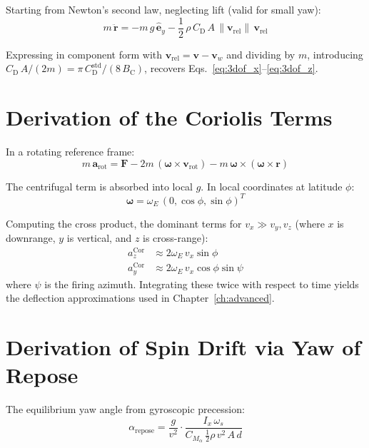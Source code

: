 \documentclass[11pt,twoside,openright]{report}
\newcommand{\Cd}{C_{\mathrm{D}}}
\newcommand{\Bc}{B_{\mathrm{C}}}
\newcommand{\vvec}{\bm{v}}
\newcommand{\avec}{\bm{a}}
\newcommand{\rvec}{\bm{r}}
\begin{document}
Starting from Newton's second law, neglecting lift (valid for small yaw):
\begin{equation}
  m\,\ddot{\rvec} = -m\,g\,\hat{\bm{e}}_y - \frac{1}{2}\,\rho\,\Cd\,A\,\|\vvec_{\mathrm{rel}}\|\,\vvec_{\mathrm{rel}}
\end{equation}

Expressing in component form with $\vvec_{\mathrm{rel}} = \vvec - \vvec_w$ and dividing by $m$, introducing $\Cd\,A/(2m) = \pi\,\Cd^{\mathrm{std}}/(8\,\Bc)$, recovers Eqs.~\eqref{eq:3dof_x}--\eqref{eq:3dof_z}.

\section{Derivation of the Coriolis Terms}

In a rotating reference frame:
\begin{equation}
  m\,\avec_{\mathrm{rot}} = \bm{F} - 2m\,(\bm{\omega}\times\vvec_{\mathrm{rot}}) - m\,\bm{\omega}\times(\bm{\omega}\times\rvec)
\end{equation}

The centrifugal term is absorbed into local $g$. In local coordinates at latitude $\phi$:
\begin{equation}
  \bm{\omega} = \omega_E\,(0, \cos\phi, \sin\phi)^T
\end{equation}

Computing the cross product, the dominant terms for $v_x \gg v_y, v_z$ (where $x$ is downrange, $y$ is vertical, and $z$ is cross-range):
\begin{align}
  a_z^{\mathrm{Cor}} &\approx 2\omega_E\,v_x\sin\phi \label{eq:app_cor_z}\\
  a_y^{\mathrm{Cor}} &\approx 2\omega_E\,v_x\cos\phi\sin\psi \label{eq:app_cor_y}
\end{align}
where $\psi$ is the firing azimuth. Integrating these twice with respect to time yields the deflection approximations used in Chapter~\ref{ch:advanced}.

\section{Derivation of Spin Drift via Yaw of Repose}

The equilibrium yaw angle from gyroscopic precession:
\begin{equation}
  \alpha_{\mathrm{repose}} = \frac{g}{v^2}\cdot\frac{I_x\,\omega_s}{C_{M_\alpha}\,\frac{1}{2}\rho\,v^2\,A\,d}
\end{equation}
\end{document}
